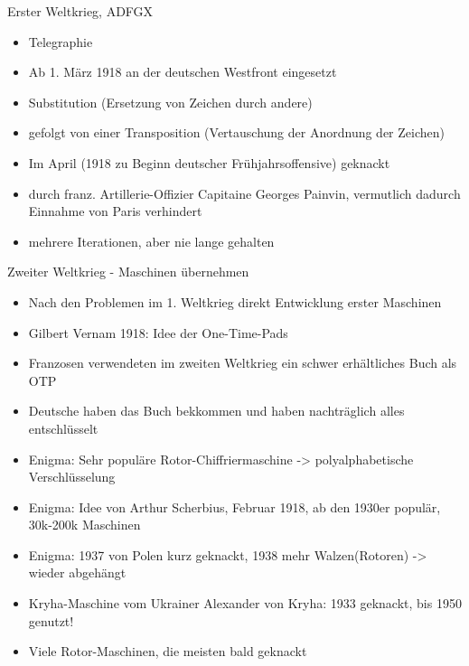   \begin{frame}{Erster Weltkrieg, ADFGX}
    \begin{itemize}
      \item{Telegraphie}
      \item{Ab 1. März 1918 an der deutschen Westfront eingesetzt}
      \item{Substitution (Ersetzung von Zeichen durch andere)}
      \item{gefolgt von einer Transposition (Vertauschung der Anordnung der Zeichen)}
      \item{Im April (1918 zu Beginn deutscher Frühjahrsoffensive) geknackt}
      \item{durch franz. Artillerie-Offizier Capitaine Georges Painvin, vermutlich dadurch Einnahme von Paris verhindert}
      \item{mehrere Iterationen, aber nie lange gehalten}
    \end{itemize}
  \end{frame}
  \begin{frame}{Zweiter Weltkrieg - Maschinen übernehmen}
    \begin{itemize}
      \item{Nach den Problemen im 1. Weltkrieg direkt Entwicklung erster Maschinen}
      \item{Gilbert Vernam 1918: Idee der One-Time-Pads}
      \item{Franzosen verwendeten im zweiten Weltkrieg ein schwer erhältliches Buch als OTP}
      \item{Deutsche haben das Buch bekkommen und haben nachträglich alles entschlüsselt}
      \item{Enigma: Sehr populäre Rotor-Chiffriermaschine -> polyalphabetische Verschlüsselung}
      \item{Enigma: Idee von Arthur Scherbius, Februar 1918, ab den 1930er populär, 30k-200k Maschinen}
      \item{Enigma: 1937 von Polen kurz geknackt, 1938 mehr Walzen(Rotoren) -> wieder abgehängt}
      \item{Kryha-Maschine vom Ukrainer Alexander von Kryha: 1933 geknackt, bis 1950 genutzt!}
      \item{Viele Rotor-Maschinen, die meisten bald geknackt}
    \end{itemize}
  \end{frame}
